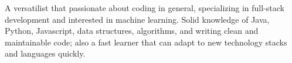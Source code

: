 

\begin{cvparagraph}

A versatilist that passionate about coding in general, specializing in full-stack development and interested in machine learning. Solid knowledge of Java, Python, Javascript, data structures, algorithms, and writing clean and maintainable code; also a fast learner that can adapt to new technology stacks and languages quickly.
\end{cvparagraph}
